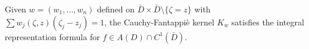 
Given $w = (w_1, \ldots, w_n)$ defined on $\bar{D} \times \bar{D} \setminus \{\zeta = z\}$ with $\sum w_j(\zeta, z)(\zeta_j - z_j) = 1$, the Cauchy-Fantappiè kernel $K_w$ satisfies the integral representation formula for $f \in A(D) \cap C^1(\bar{D})$.
